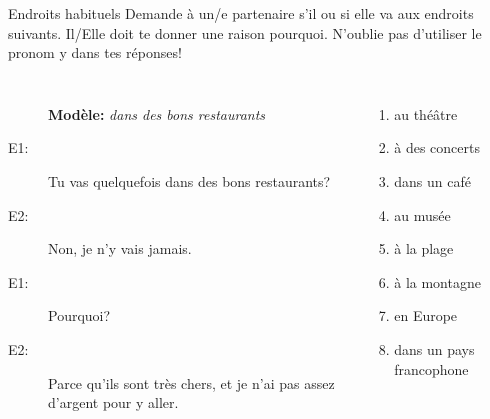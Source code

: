 \documentclass{beamer}
\begin{document}
  \begin{frame}{Endroits habituels}
    Demande à un/e partenaire s'il ou si elle va aux endroits suivants.
    Il/Elle doit te donner une raison pourquoi.
    \alert{N'oublie pas} d'utiliser le pronom \alert{y} dans tes réponses!
    \begin{columns}[t]
        \begin{description}
          \item[] \textbf{Modèle:} \textit{dans des bons restaurants}
          \item[E1:] Tu vas quelquefois dans des bons restaurants?
          \item[E2:] Non, je n'\alert{y} vais jamais.
          \item[E1:] Pourquoi?
          \item[E2:] Parce qu'ils sont très chers, et je n'ai pas assez d'argent pour \alert{y} aller.
        \end{description}
        \begin{enumerate}
          \item au théâtre
          \item à des concerts
          \item dans un café
          \item au musée
          \item à la plage
          \item à la montagne
          \item en Europe
          \item dans un pays francophone
        \end{enumerate}
    \end{columns}
  \end{frame}
\end{document}
